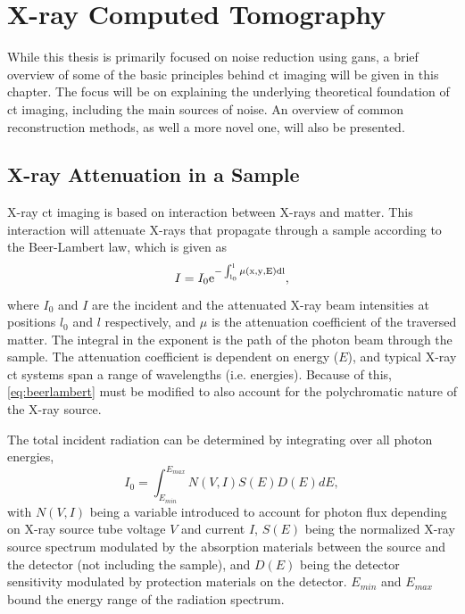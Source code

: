 \chapter{X-ray Computed Tomography}
\label{sec:ct}
While this thesis is primarily focused on noise reduction using \gls{gan}s, a brief overview of some of the basic principles behind \gls{ct} imaging will be given in this chapter. The focus will be on explaining the underlying theoretical foundation of \gls{ct} imaging, including the main sources of noise. An overview of common reconstruction methods, as well a more novel one, will also be presented.

\section{X-ray Attenuation in a Sample}
\label{sec:ct:theoreticalfoundation}
X-ray \gls{ct} imaging is based on interaction between X-rays and matter. This interaction will attenuate X-rays that propagate through a sample according to the Beer-Lambert law, which is given as \cite{doi:10.1063/1.4950807}
\begin{equation}
    \label{eq:beerlambert}
    I = I_0 \rm{e}^{-\int_{l_0}^{l}\mu\left(x,y,E\right)dl},
\end{equation}
where $I_0$ and $I$ are the incident and the attenuated X-ray beam intensities at positions $l_0$ and $l$ respectively, and $\mu$ is the attenuation coefficient of the traversed matter. The integral in the exponent is the path of the photon beam through the sample. The attenuation coefficient is dependent on energy ($E$), and typical X-ray \gls{ct} systems span a range of wavelengths (i.e. energies). 
Because of this, \cref{eq:beerlambert} must be modified to also account for the polychromatic nature of the X-ray source. 

The total incident radiation can be determined by integrating over all photon energies, 
\begin{equation}
    \label{eq:incidentradiation}
    I_0 = \int_{E_{min}}^{E_{max}}N\left(V,I\right)S\left(E\right)D\left(E\right)dE,
\end{equation}
with $N\left(V,I\right)$ being a variable introduced to account for photon flux depending on X-ray source tube voltage $V$ and current $I$, $S\left(E\right)$ being the normalized X-ray source spectrum modulated by the absorption materials between the source and the detector (not including the sample), and $D\left(E\right)$ being the detector sensitivity modulated by protection materials on the detector. $E_{min}$ and $E_{max}$ bound the energy range of the radiation spectrum. 

